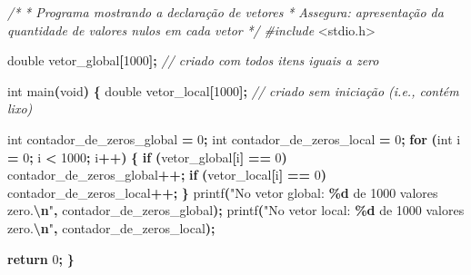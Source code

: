\documentclass[
  11pt,
  a4paper,
]{scrbook}
\newenvironment{Shaded}{\begin{snugshade}}{\end{snugshade}}
\newcommand{\CommentTok}[1]{\textcolor[rgb]{0.56,0.35,0.01}{\textit{#1}}}
\newcommand{\ControlFlowTok}[1]{\textcolor[rgb]{0.13,0.29,0.53}{\textbf{#1}}}
\newcommand{\DataTypeTok}[1]{\textcolor[rgb]{0.13,0.29,0.53}{#1}}
\newcommand{\DecValTok}[1]{\textcolor[rgb]{0.00,0.00,0.81}{#1}}
\newcommand{\ImportTok}[1]{#1}
\newcommand{\NormalTok}[1]{#1}
\newcommand{\OperatorTok}[1]{\textcolor[rgb]{0.81,0.36,0.00}{\textbf{#1}}}
\newcommand{\PreprocessorTok}[1]{\textcolor[rgb]{0.56,0.35,0.01}{\textit{#1}}}
\newcommand{\SpecialCharTok}[1]{\textcolor[rgb]{0.81,0.36,0.00}{\textbf{#1}}}
\newcommand{\StringTok}[1]{\textcolor[rgb]{0.31,0.60,0.02}{#1}}
\begin{document}
\begin{Shaded}
\begin{Highlighting}[]
\CommentTok{/*}
\CommentTok{ * Programa mostrando a declaração de vetores}
\CommentTok{ * Assegura: apresentação da quantidade de valores nulos em cada vetor}
\CommentTok{ */}
\PreprocessorTok{\#include }\ImportTok{\textless{}stdio.h\textgreater{}}

\DataTypeTok{double}\NormalTok{ vetor\_global}\OperatorTok{[}\DecValTok{1000}\OperatorTok{];}  \CommentTok{// criado com todos itens iguais a zero}

\DataTypeTok{int}\NormalTok{ main}\OperatorTok{(}\DataTypeTok{void}\OperatorTok{)} \OperatorTok{\{}
    \DataTypeTok{double}\NormalTok{ vetor\_local}\OperatorTok{[}\DecValTok{1000}\OperatorTok{];}  \CommentTok{// criado sem iniciação (i.e., contém lixo)}

    \DataTypeTok{int}\NormalTok{ contador\_de\_zeros\_global }\OperatorTok{=} \DecValTok{0}\OperatorTok{;}
    \DataTypeTok{int}\NormalTok{ contador\_de\_zeros\_local }\OperatorTok{=} \DecValTok{0}\OperatorTok{;}
    \ControlFlowTok{for} \OperatorTok{(}\DataTypeTok{int}\NormalTok{ i }\OperatorTok{=} \DecValTok{0}\OperatorTok{;}\NormalTok{ i }\OperatorTok{\textless{}} \DecValTok{1000}\OperatorTok{;}\NormalTok{ i}\OperatorTok{++)} \OperatorTok{\{}
        \ControlFlowTok{if} \OperatorTok{(}\NormalTok{vetor\_global}\OperatorTok{[}\NormalTok{i}\OperatorTok{]} \OperatorTok{==} \DecValTok{0}\OperatorTok{)}
\NormalTok{            contador\_de\_zeros\_global}\OperatorTok{++;}
        \ControlFlowTok{if} \OperatorTok{(}\NormalTok{vetor\_local}\OperatorTok{[}\NormalTok{i}\OperatorTok{]} \OperatorTok{==} \DecValTok{0}\OperatorTok{)}
\NormalTok{            contador\_de\_zeros\_local}\OperatorTok{++;}
    \OperatorTok{\}}
\NormalTok{    printf}\OperatorTok{(}\StringTok{"No vetor global: }\SpecialCharTok{\%d}\StringTok{ de 1000 valores zero.}\SpecialCharTok{\textbackslash{}n}\StringTok{"}\OperatorTok{,}
\NormalTok{           contador\_de\_zeros\_global}\OperatorTok{);}
\NormalTok{    printf}\OperatorTok{(}\StringTok{"No vetor local: }\SpecialCharTok{\%d}\StringTok{ de 1000 valores zero.}\SpecialCharTok{\textbackslash{}n}\StringTok{"}\OperatorTok{,}
\NormalTok{           contador\_de\_zeros\_local}\OperatorTok{);}

    \ControlFlowTok{return} \DecValTok{0}\OperatorTok{;}
\OperatorTok{\}}
\end{Highlighting}
\end{Shaded}
\end{document}
